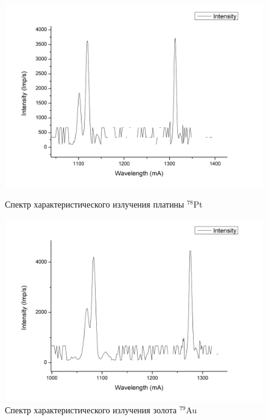 \documentclass[a4paper]{article}
\begin{document}
\begin{enumerate}
    \begin{figure}[h]
\begin{center}
\begin{minipage}[h]{0.45\linewidth}
\includegraphics[width=1\linewidth]{Pt.png}
\caption{Спектр характеристического излучения платины $^{78}$Pt} %
\end{minipage}
\hfill 
\begin{minipage}[h]{0.45\linewidth}
\includegraphics[width=1\linewidth]{Au.png}
\caption{Спектр характеристического излучения золота $^{79}$Au}
\label{ris:experimcoded}
\end{minipage}
\end{center}
\end{figure}



\end{enumerate}
\end{document}
